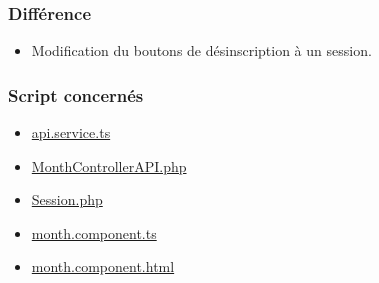 \subsubsection{Différence}
	\begin{itemize}
		\item Modification du boutons de désinscription à un session. 
	\end{itemize}

\vspace{\baselineskip}
\subsubsection{Script concernés}
	\begin{itemize}
		\item \href{https://github.com/victorsmits/Aquabike/blob/master/frontend/src/app/service/api.service.ts}{api.service.ts}
		\item \href{https://github.com/victorsmits/Aquabike/blob/master/backend/src/Controller/API/MonthControllerAPI.php}{MonthControllerAPI.php}
		\item \href{https://github.com/victorsmits/Aquabike/blob/master/backend/src/Entity/Session.php}{Session.php}
		\item \href{https://github.com/victorsmits/Aquabike/blob/master/frontend/src/app/month/month.component.ts}{month.component.ts}
		\item \href{https://github.com/victorsmits/Aquabike/blob/master/frontend/src/app/month/month.component.html}{month.component.html}
	\end{itemize}